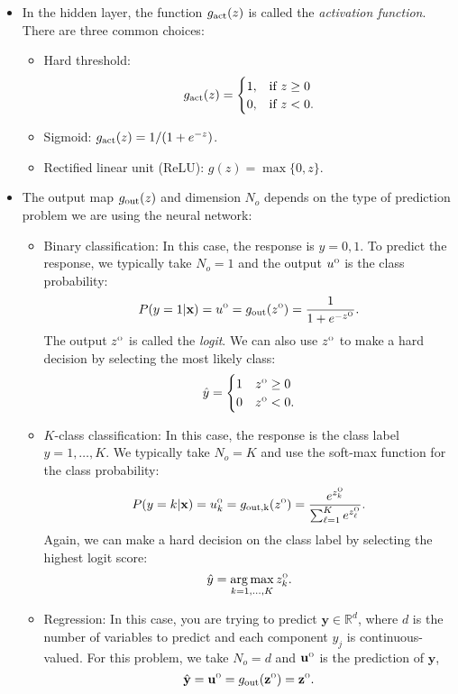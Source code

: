 \documentclass[11pt]{article}
\def\beq{\begin{equation}}
\def\eeq{\end{equation}}
\def\R{{\mathbb{R}}}
\def\argmax{\mathop{\mathrm{arg\,max}}}
\newcommand{\ubf}{\mathbf{u}}
\newcommand{\xbf}{\mathbf{x}}
\newcommand{\ybf}{\mathbf{y}}
\newcommand{\zbf}{\mathbf{z}}
\def\out{\textsc{\tiny O}}
\def\zout{z^\out}
\begin{document}
\begin{itemize}
\item In the hidden layer, the function $g_{\rm act}(z)$ is called the \emph{activation function}.
There are three common choices:
\begin{itemize}
\item Hard threshold:
\beq \label{eq:gact_ht}
    g_{\rm act}(z) = \begin{cases}
        1, & \mbox{if } z \geq 0 \\
        0, & \mbox{if } z < 0.
        \end{cases}
\eeq
\item Sigmoid: $g_{\rm act}(z) = 1/(1+e^{-z})$.

\item Rectified linear unit (ReLU): $g(z) = \max\{0,z\}$.
\end{itemize}

\item The output map $g_{\rm out}(z)$ and dimension $N_o$
depends on the type of prediction problem we are using the neural
network:
\begin{itemize}
\item Binary classification:  In this case, the response
is $y=0,1$.  To predict the response, we typically take $N_o = 1$ and
the output $u^\out$ is the class probability:
\beq \label{eq:gout_binary_soft}
    P(y=1|\xbf) = u^\out = g_{\rm out}(z^\out) = \frac{1}{1 + e^{-\zout}}.
\eeq
The output $\zout$ is called the \emph{logit}.
We can also use $\zout$ to make a hard decision by selecting the most likely class:
\beq \label{eq:gout_thresh}
    \hat{y} =  \begin{cases}
        1 & z^\out \geq 0 \\
        0 & z^\out < 0.
        \end{cases}
\eeq

\item  $K$-class classification:  In this case,
the response is the class label $y=1,\ldots,K$.  We typically take $N_o = K$ and use the
soft-max function for the class probability:
\beq \label{eq:gout_mc_soft}
    P(y=k|\xbf) = u^\out_k =  g_{\rm out,k}(z^\out) = \frac{e^{z^\out_k}}{\sum_{\ell=1}^K  e^{z^\out_\ell}}.
\eeq
Again, we can make a hard decision on the class label by selecting the highest logit score:
\beq \label{eq:gout_argmax}
    \hat{y} = \argmax_{k=1,\ldots,K} z^\out_k.
\eeq

\item Regression: In this case, you are trying to predict $\ybf \in \R^d$,
where $d$ is the number of variables to predict and each component $y_j$
is continuous-valued.  For this problem, we take $N_o=d$ and $\ubf^\out$ is the prediction of $\ybf$,
\beq \label{eq:gout_id}
    \hat{\ybf} = \ubf^\out = g_{\rm out}(\zbf^\out) = \zbf^\out.
\eeq
\end{itemize}


\end{itemize}
\end{document}
